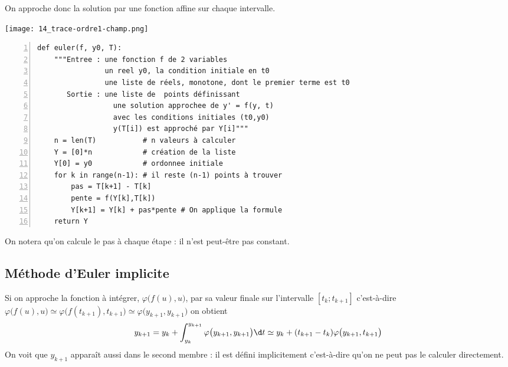 On approche donc  la solution par une fonction  affine sur chaque intervalle.
\begin{center}
\texttt{[image: 14\_trace-ordre1-champ.png]}
\end{center}
\newpage
\begin{lstlisting}[numbers=left, caption=Euler explicite]
def euler(f, y0, T):
    """Entree : une fonction f de 2 variables
                un reel y0, la condition initiale en t0
                une liste de réels, monotone, dont le premier terme est t0
       Sortie : une liste de  points définissant 
                  une solution approchee de y' = f(y, t)
                  avec les conditions initiales (t0,y0)
                  y(T[i]) est approché par Y[i]"""
    n = len(T)           # n valeurs à calculer
    Y = [0]*n            # création de la liste
    Y[0] = y0            # ordonnee initiale
    for k in range(n-1): # il reste (n-1) points à trouver
        pas = T[k+1] - T[k]
        pente = f(Y[k],T[k])
        Y[k+1] = Y[k] + pas*pente # On applique la formule
    return Y
\end{lstlisting}

On notera qu'on calcule le pas à chaque étape : il n'est peut-être pas constant.
\subsection{Méthode d'Euler implicite}
Si on approche la fonction à intégrer, $\varphi\bigl(f(u),u\bigr)$, par sa valeur finale sur l'intervalle $[t_k;t_{k+1}]$ c'est-à-dire $\varphi\bigl(f(u),u\bigr) \simeq \varphi\bigl(f(t_{k+1}),t_{k+1}\bigr)\simeq \varphi \bigl(y_{k+1},y_{k+1}\bigr)$ on obtient
\[y_{k+1} =  y_k+\int_{y_{k}}^{y_{k+1}}\varphi \bigl(y_{k+1},y_{k+1}\bigr) \d t  \simeq y_k+ (t_{k+1}-t_k) \varphi \bigl(y_{k+1},t_{k+1}\bigr)\]
On voit que $y_{k+1}$ apparaît aussi dans le second membre : il est défini implicitement c'est-à-dire qu'on ne peut pas le calculer directement.

